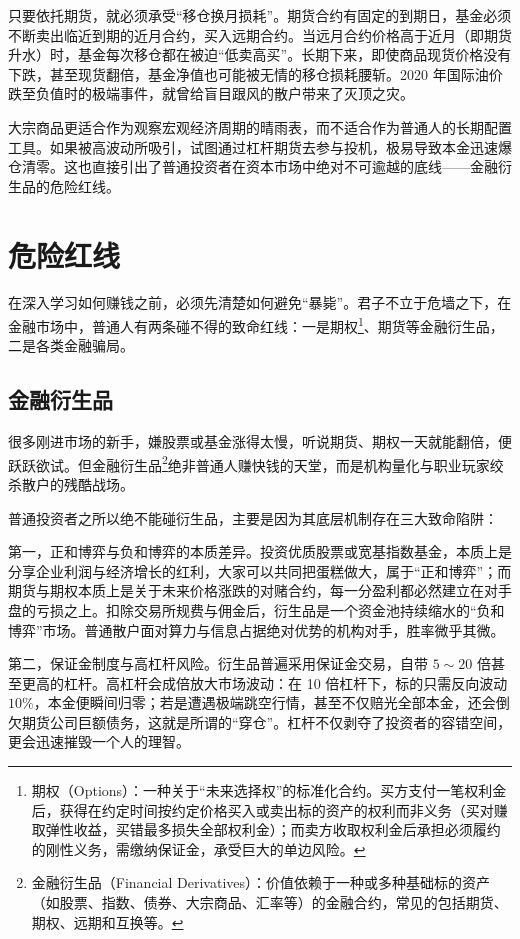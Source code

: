 \documentclass[12pt,openany]{book}
\begin{document}
只要依托期货，就必须承受“移仓换月损耗”。期货合约有固定的到期日，基金必须不断卖出临近到期的近月合约，买入远期合约。当远月合约价格高于近月（即期货升水）时，基金每次移仓都在被迫“低卖高买”。长期下来，即使商品现货价格没有下跌，甚至现货翻倍，基金净值也可能被无情的移仓损耗腰斩。2020 年国际油价跌至负值时的极端事件，就曾给盲目跟风的散户带来了灭顶之灾。

大宗商品更适合作为观察宏观经济周期的晴雨表，而不适合作为普通人的长期配置工具。如果被高波动所吸引，试图通过杠杆期货去参与投机，极易导致本金迅速爆仓清零。这也直接引出了普通投资者在资本市场中绝对不可逾越的底线——金融衍生品的危险红线。

\section{危险红线}

在深入学习如何赚钱之前，必须先清楚如何避免“暴毙”。君子不立于危墙之下，在金融市场中，普通人有两条碰不得的致命红线：一是期权\footnote{期权（Options）：一种关于“未来选择权”的标准化合约。买方支付一笔权利金后，获得在约定时间按约定价格买入或卖出标的资产的权利而非义务（买对赚取弹性收益，买错最多损失全部权利金）；而卖方收取权利金后承担必须履约的刚性义务，需缴纳保证金，承受巨大的单边风险。}、期货等金融衍生品，二是各类金融骗局。

\subsection{金融衍生品}

很多刚进市场的新手，嫌股票或基金涨得太慢，听说期货、期权一天就能翻倍，便跃跃欲试。但金融衍生品\footnote{金融衍生品（Financial Derivatives）：价值依赖于一种或多种基础标的资产（如股票、指数、债券、大宗商品、汇率等）的金融合约，常见的包括期货、期权、远期和互换等。}绝非普通人赚快钱的天堂，而是机构量化与职业玩家绞杀散户的残酷战场。

普通投资者之所以绝不能碰衍生品，主要是因为其底层机制存在三大致命陷阱：

第一，正和博弈与负和博弈的本质差异。投资优质股票或宽基指数基金，本质上是分享企业利润与经济增长的红利，大家可以共同把蛋糕做大，属于“正和博弈”；而期货与期权本质上是关于未来价格涨跌的对赌合约，每一分盈利都必然建立在对手盘的亏损之上。扣除交易所规费与佣金后，衍生品是一个资金池持续缩水的“负和博弈”市场。普通散户面对算力与信息占据绝对优势的机构对手，胜率微乎其微。

第二，保证金制度与高杠杆风险。衍生品普遍采用保证金交易，自带 $5\sim 20$ 倍甚至更高的杠杆。高杠杆会成倍放大市场波动：在 10 倍杠杆下，标的只需反向波动 $10\%$，本金便瞬间归零；若是遭遇极端跳空行情，甚至不仅赔光全部本金，还会倒欠期货公司巨额债务，这就是所谓的“穿仓”。杠杆不仅剥夺了投资者的容错空间，更会迅速摧毁一个人的理智。
\end{document}

